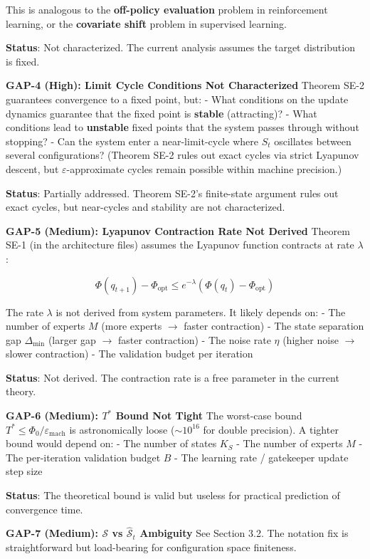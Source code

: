 \documentclass[
  12pt,
]{ctexart}
\begin{document}
This is analogous to the \textbf{off-policy evaluation} problem in
reinforcement learning, or the \textbf{covariate shift} problem in
supervised learning.

\textbf{Status}: Not characterized. The current analysis assumes the
target distribution is fixed.

\textbf{GAP-4 (High): Limit Cycle Conditions Not Characterized} Theorem
SE-2 guarantees convergence to a fixed point, but: - What conditions on
the update dynamics guarantee that the fixed point is \textbf{stable}
(attracting)? - What conditions lead to \textbf{unstable} fixed points
that the system passes through without stopping? - Can the system enter
a near-limit-cycle where \(S_t\) oscillates between several
configurations? (Theorem SE-2 rules out exact cycles via strict Lyapunov
descent, but \(\varepsilon\)-approximate cycles remain possible within
machine precision.)

\textbf{Status}: Partially addressed. Theorem SE-2's finite-state
argument rules out exact cycles, but near-cycles and stability are not
characterized.

\textbf{GAP-5 (Medium): Lyapunov Contraction Rate Not Derived} Theorem
SE-1 (in the architecture files) assumes the Lyapunov function contracts
at rate \(\lambda\):

\[\Phi(q_{t+1}) - \Phi_{\text{opt}} \leq e^{-\lambda}(\Phi(q_t) - \Phi_{\text{opt}})\]

The rate \(\lambda\) is not derived from system parameters. It likely
depends on: - The number of experts \(M\) (more experts \(\to\) faster
contraction) - The state separation gap \(\Delta_{\min}\) (larger gap
\(\to\) faster contraction) - The noise rate \(\eta\) (higher noise
\(\to\) slower contraction) - The validation budget per iteration

\textbf{Status}: Not derived. The contraction rate is a free parameter
in the current theory.

\textbf{GAP-6 (Medium): \(T^*\) Bound Not Tight} The worst-case bound
\(T^* \leq \Phi_0/\varepsilon_{\text{mach}}\) is astronomically loose
(\(\sim 10^{16}\) for double precision). A tighter bound would depend
on: - The number of states \(K_S\) - The number of experts \(M\) - The
per-iteration validation budget \(B\) - The learning rate / gatekeeper
update step size

\textbf{Status}: The theoretical bound is valid but useless for
practical prediction of convergence time.

\textbf{GAP-7 (Medium): \(\mathcal{S}\) vs \(\hat{\mathcal{S}}_t\)
Ambiguity} See Section 3.2. The notation fix is straightforward but
load-bearing for configuration space finiteness.
\end{document}
